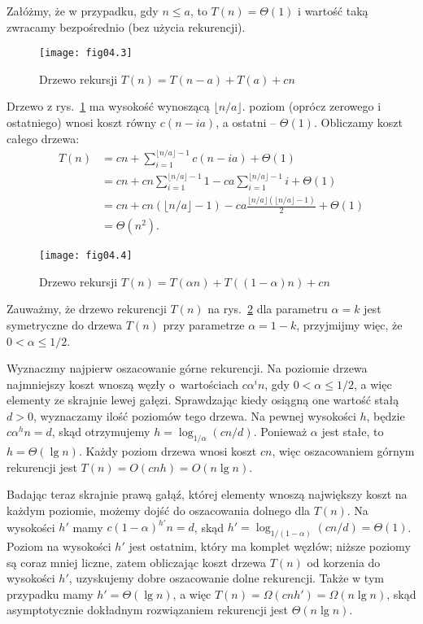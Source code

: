 \exercise{} %
\noindent Załóżmy, że w przypadku, gdy $n\le a$, to $T(n)=\Theta(1)$ i wartość taką zwracamy bezpośrednio (bez użycia rekurencji).
\begin{figure}[ht]
	\begin{center}
		\texttt{[image: fig04.3]}
	\end{center}
	\caption{Drzewo rekursji $T(n)=T(n-a)+T(a)+cn$} \label{fig:4.2-4}
\end{figure}
Drzewo z rys.~\ref{fig:4.2-4} ma wysokość wynoszącą $\lfloor n/a\rfloor$.  poziom (oprócz zerowego i ostatniego) wnosi koszt równy $c(n-ia)$, a ostatni -- $\Theta(1)$. Obliczamy koszt całego drzewa:
\begin{align*}
	T(n) &= cn+\sum_{i=1}^{\lfloor n/a\rfloor-1}c(n-ia)+\Theta(1) \\
	&= cn+cn\sum_{i=1}^{\lfloor n/a\rfloor-1}1-ca\sum_{i=1}^{\lfloor n/a\rfloor-1}i+\Theta(1) \\
	&= cn+cn(\lfloor n/a\rfloor-1)-ca\frac{\lfloor n/a\rfloor(\lfloor n/a\rfloor-1)}{2}+\Theta(1) \\
	&= \Theta(n^2).
\end{align*}

\exercise{} %
\begin{figure}[ht]
	\begin{center}
		\texttt{[image: fig04.4]}
	\end{center}
	\caption{Drzewo rekursji $T(n)=T(\alpha n)+T((1-\alpha)n)+cn$} \label{fig:4.2-5}
\end{figure}

\noindent Zauważmy, że drzewo rekurencji $T(n)$ na rys.~\ref{fig:4.2-5} dla parametru $\alpha=k$ jest symetryczne do drzewa $T(n)$ przy parametrze $\alpha=1-k$, przyjmijmy więc, że $0<\alpha\le1/2$.

Wyznaczmy najpierw oszacowanie górne rekurencji. Na  poziomie drzewa najmniejszy koszt wnoszą węzły o~wartościach $c\alpha^in$, gdy $0<\alpha\le1/2$, a więc elementy ze skrajnie lewej gałęzi. Sprawdzając kiedy osiągną one wartość stałą $d>0$, wyznaczamy ilość poziomów tego drzewa. Na pewnej wysokości $h$, będzie $c\alpha^hn=d$, skąd otrzymujemy $h=\log_{1/\alpha}(cn/d)$. Ponieważ $\alpha$ jest stałe, to $h=\Theta(\lg n)$. Każdy poziom drzewa wnosi koszt $cn$, więc oszacowaniem górnym rekurencji jest $T(n)=O(cnh)=O(n\lg n)$.

Badając teraz skrajnie prawą gałąź, której elementy wnoszą największy koszt na każdym poziomie, możemy dojść do oszacowania dolnego dla $T(n)$. Na wysokości $h'$ mamy $c(1-\alpha)^{h'}n=d$, skąd $h'=\log_{1/(1-\alpha)}(cn/d)=\Theta(1)$. Poziom na wysokości $h'$ jest ostatnim, który ma komplet węzłów; niższe poziomy są coraz mniej liczne, zatem obliczając koszt drzewa $T(n)$ od korzenia do wysokości $h'$, uzyskujemy dobre oszacowanie dolne rekurencji. Także w tym przypadku mamy $h'=\Theta(\lg n)$, a więc $T(n)=\Omega(cnh')=\Omega(n\lg n)$, skąd asymptotycznie dokładnym rozwiązaniem rekurencji jest $\Theta(n\lg n)$.

